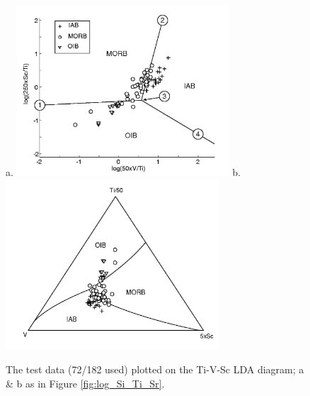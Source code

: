 \begin{figure}[htbp]
  \centering
a.  \includegraphics[width=300]{figures/log_V_Ti_Sc_lin.jpg}
b.  \includegraphics[width=300]{figures/test_V_Ti_Sc_lin.jpg}
  \caption[The test data plotted on the Ti-V-Sc diagram]
{The test data (72/182 used) plotted on the Ti-V-Sc LDA diagram;  a \&
b as in Figure \ref{fig:log_Si_Ti_Sr}.}
  \label{fig:log_V_Ti_Sc}
\end{figure}

